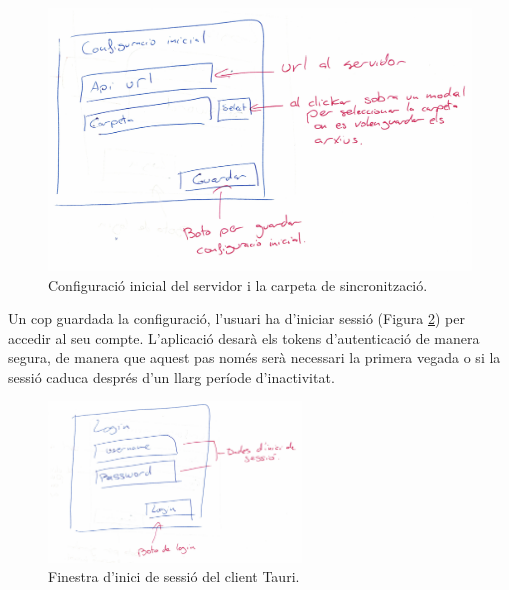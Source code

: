 \begin{figure}[H]
    \centering
    \includegraphics[width=\textwidth]{Figures/interficies/tauri-config-inicial.jpg}
    \caption{Configuració inicial del servidor i la carpeta de sincronització.}
    \label{fig:tauri_config_inicial}
\end{figure}

Un cop guardada la configuració, l'usuari ha d'iniciar sessió (Figura \ref{fig:tauri_login}) per accedir al seu compte. L'aplicació desarà els tokens d'autenticació de manera segura, de manera que aquest pas només serà necessari la primera vegada o si la sessió caduca després d'un llarg període d'inactivitat.

\begin{figure}[H]
    \centering
    \includegraphics[width=0.6\textwidth]{Figures/interficies/tauri-login.jpg}
    \caption{Finestra d'inici de sessió del client Tauri.}
    \label{fig:tauri_login}
\end{figure}

